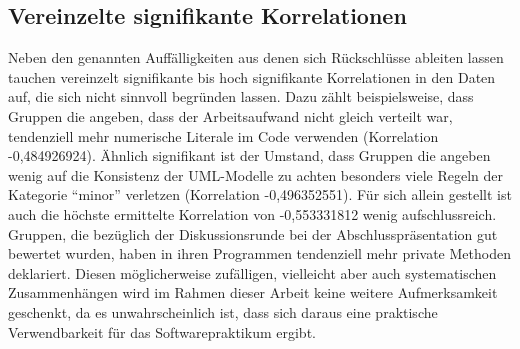 \documentclass[da,ngerman]{stthesis}
\begin{document}
  			\subsection{Vereinzelte signifikante Korrelationen}
  				Neben den genannten Auffälligkeiten aus denen sich Rückschlüsse ableiten lassen tauchen vereinzelt signifikante bis hoch signifikante Korrelationen in den Daten auf, die sich nicht sinnvoll begründen lassen. Dazu zählt beispielsweise, dass Gruppen die angeben, dass der Arbeitsaufwand nicht gleich verteilt war, tendenziell mehr numerische Literale im Code verwenden (Korrelation -0,484926924). Ähnlich signifikant ist der Umstand, dass Gruppen die angeben wenig auf die Konsistenz der UML-Modelle zu achten besonders viele Regeln der Kategorie "`minor"' verletzen (Korrelation -0,496352551). Für sich allein gestellt ist auch die höchste ermittelte Korrelation von -0,553331812 wenig aufschlussreich. Gruppen, die bezüglich der Diskussionsrunde bei der Abschlusspräsentation gut bewertet wurden, haben in ihren Programmen tendenziell mehr private Methoden deklariert. Diesen möglicherweise zufälligen, vielleicht aber auch systematischen Zusammenhängen wird im Rahmen dieser Arbeit keine weitere Aufmerksamkeit geschenkt, da es unwahrscheinlich ist, dass sich daraus eine praktische Verwendbarkeit für das Softwarepraktikum ergibt.
\end{document}
